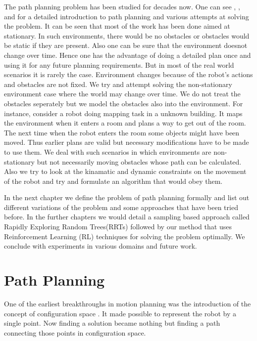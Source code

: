 \documentclass[MTech]{iitmdiss}
\begin{document}
 
The path planning problem has been studied for decades now. One can see \cite{choset05}, \cite{deberg00} , \cite{latombe91}  and \cite{lav06} for a detailed introduction to path planning and various attempts at solving the problem. It can be seen that most of the work has been done aimed at stationary. In such environments, there would  be no obstacles or obstacles would be static if they are present. Also one can be sure that the environment doesnot change over time. Hence one has the advantage of doing a detailed plan once and using it for any future planning requirements. But in most of the real world scenarios it is rarely the case. Environment changes because of the robot's actions and obstacles are not fixed. We try and attempt solving the non-stationary environment case where the world may change over time. We do not treat the obstacles seperately but we model the obstacles also into the environment. For instance, consider a robot doing mapping task in a unknown building. It maps the environment when it enters a room and plans a way to get out of the room. The next time when the robot enters the room some objects might have been moved. Thus earlier plans are valid but necessary modifications have to be made to use them. We deal with such scenarios in which environments are non-stationary but not necessarily moving obstacles whose path can be calculated. Also we try to look at the kinamatic and dynamic constraints on the movement of the robot and try and formulate an algorithm that would obey them.

In the next chapter we define the problem of path planning formally and list out different variations of the problem and some approaches that have been tried before. In the further chapters we would detail a sampling based approach called Rapidly Exploring Random Trees(RRTs) followed by our method that uses Reinforcement Learning (RL) techniques for solving the problem optimally. We conclude with experiments in various domains and future work.

\chapter{Path Planning}

One of the earliest breakthroughs in motion planning was the introduction of the concept of configuration space \cite{perez79}.  It made possible to represent the robot by a single point. Now finding a solution became nothing but finding a path connecting those points in configuration space. 
\end{document}

